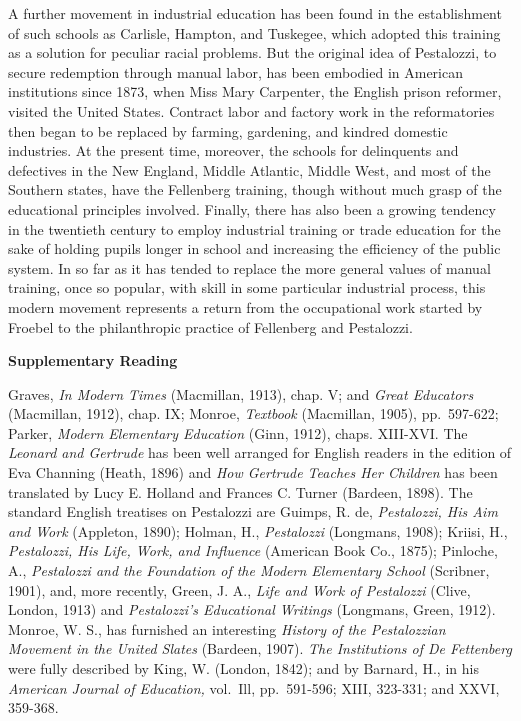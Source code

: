\documentclass[]{book}
\begin{document}
A further movement in industrial education has been found in the establishment of such schools as Carlisle, Hampton, and Tuskegee, which adopted this training as a solution for peculiar racial problems. But the original idea of Pestalozzi, to secure redemption through manual labor, has been embodied in American institutions since 1873, when Miss Mary Carpenter, the English prison reformer, visited the United States. Contract labor and factory work in the reformatories then began to be replaced by farming, gardening, and kindred domestic industries. At the present time, moreover, the schools for delinquents and defectives in the New England, Middle Atlantic, Middle West, and most of the Southern states, have the Fellenberg training, though without much grasp of the educational principles involved. Finally, there has also been a growing tendency in the twentieth century to employ industrial training or trade education for the sake of holding pupils longer in school and increasing the efficiency of the public system. In so far as it has tended to replace the more general values of manual training, once so popular, with skill in some particular industrial process, this modern movement represents a return from the occupational work started by Froebel to the philanthropic practice of Fellenberg and Pestalozzi.

\textbf{Supplementary Reading}

Graves, \emph{In Modern Times} (Macmillan, 1913), chap. V; and \emph{Great Educators} (Macmillan, 1912), chap. IX; Monroe, \emph{Textbook} (Macmillan, 1905), pp.~597-622; Parker, \emph{Modern Elementary Education} (Ginn, 1912), chaps. XIII-XVI. The \emph{Leonard and Gertrude} has been well arranged for English readers in the edition of Eva Channing (Heath, 1896) and \emph{How Gertrude Teaches Her Children} has been translated by Lucy E. Holland and Frances C. Turner (Bardeen, 1898). The standard English treatises on Pestalozzi are Guimps, R. de, \emph{Pestalozzi, His Aim and Work} (Appleton, 1890); Holman, H., \emph{Pestalozzi} (Longmans, 1908); Kriisi, H., \emph{Pestalozzi, His Life, Work, and Influence} (American Book Co., 1875); Pinloche, A., \emph{Pestalozzi and the Foundation of the Modern Elementary School} (Scribner, 1901), and, more recently, Green, J. A., \emph{Life and Work of Pestalozzi} (Clive, London, 1913) and \emph{Pestalozzi's Educational Writings} (Longmans, Green, 1912). Monroe, W. S., has furnished an interesting \emph{History of the Pestalozzian Movement in the United Slates} (Bardeen, 1907). \emph{The Institutions of De Fettenberg} were fully described by King, W. (London, 1842); and by Barnard, H., in his \emph{American Journal of Education,} vol.~Ill, pp.~591-596; XIII, 323-331; and XXVI, 359-368.
\end{document}
